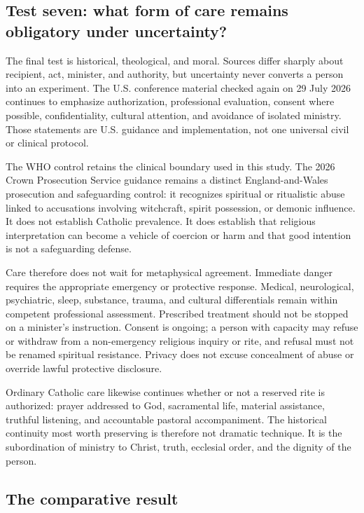 \subsection{Test seven: what form of care remains obligatory under uncertainty?}

The final test is historical, theological, and moral. Sources differ sharply
about recipient, act, minister, and authority, but uncertainty never converts
a person into an experiment. The U.S. conference material checked again on 29
July 2026 continues to emphasize authorization, professional evaluation,
consent where possible, confidentiality, cultural attention, and avoidance of
isolated ministry. Those statements are U.S. guidance and implementation, not
one universal civil or clinical protocol.

The WHO control retains the clinical boundary used in this study. The 2026
Crown Prosecution Service guidance remains a distinct England-and-Wales
prosecution and safeguarding control: it recognizes spiritual or ritualistic
abuse linked to accusations involving witchcraft, spirit possession, or
demonic influence. It does not establish Catholic prevalence. It does
establish that religious interpretation can become a vehicle of coercion or
harm and that good intention is not a safeguarding defense.

Care therefore does not wait for metaphysical agreement. Immediate danger
requires the appropriate emergency or protective response. Medical,
neurological, psychiatric, sleep, substance, trauma, and cultural
differentials remain within competent professional assessment. Prescribed
treatment should not be stopped on a minister's instruction. Consent is
ongoing; a person with capacity may refuse or withdraw from a non-emergency
religious inquiry or rite, and refusal must not be renamed spiritual
resistance. Privacy does not excuse concealment of abuse or override lawful
protective disclosure.

Ordinary Catholic care likewise continues whether or not a reserved rite is
authorized: prayer addressed to God, sacramental life, material assistance,
truthful listening, and accountable pastoral accompaniment. The historical
continuity most worth preserving is therefore not dramatic technique. It is
the subordination of ministry to Christ, truth, ecclesial order, and the
dignity of the person.

\subsection{The comparative result}

